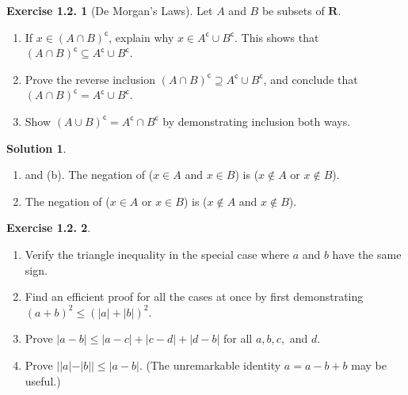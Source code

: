 \documentclass[12pt]{article}
\theoremstyle{definition}
\theoremstyle{exercise}
\newtheorem{exercise}{Exercise 1.2.}
\theoremstyle{solution}
\newtheorem*{solution}{Solution}
\newcommand{\setcomp}[1]{#1^{\mathsf{c}}}
\begin{document}
\begin{exercise}[De Morgan's Laws]
\label{ex:5}
    Let \( A \) and \( B \) be subsets of \( \mathbf{R} \).
    \begin{enumerate}[label = (\alph*)]
        \item If \( x \in \setcomp{(A \cap B)} \), explain why \( x \in \setcomp{A} \cup \setcomp{B} \). This shows that \( \setcomp{(A \cap B)} \subseteq \setcomp{A} \cup \setcomp{B} \).

        \item Prove the reverse inclusion \( \setcomp{(A \cap B)} \supseteq \setcomp{A} \cup \setcomp{B} \), and conclude that \( \setcomp{(A \cap B)} = \setcomp{A} \cup \setcomp{B} \).

        \item Show \( \setcomp{(A \cup B)} = \setcomp{A} \cap \setcomp{B} \) by demonstrating inclusion both ways.
    \end{enumerate}
\end{exercise}

\begin{solution}
    \begin{enumerate}[label = (\alph*)]
        \item and (b). The negation of (\( x \in A \) and \( x \in B \)) is (\( x \not\in A \) or \( x \not\in B \)).

        \item The negation of (\( x \in A \) or \( x \in B \)) is (\( x \not\in A \) and \( x \not\in B \)).
    \end{enumerate}
\end{solution}

\begin{exercise}
\label{ex:6}
    \begin{enumerate}[label = (\alph*)]
        \item Verify the triangle inequality in the special case where \( a \) and \( b \) have the same sign.

        \item Find an efficient proof for all the cases at once by first demonstrating \( (a + b)^2 \leq (|a| + |b|)^2 \).

        \item Prove \( |a - b| \leq |a - c| + |c - d| + |d - b| \) for all \( a, b, c, \) and \( d \).

        \item Prove \( ||a| - |b|| \leq |a - b| \). (The unremarkable identity \( a = a - b + b \) may be useful.)
    \end{enumerate}
\end{exercise}
\end{document}
